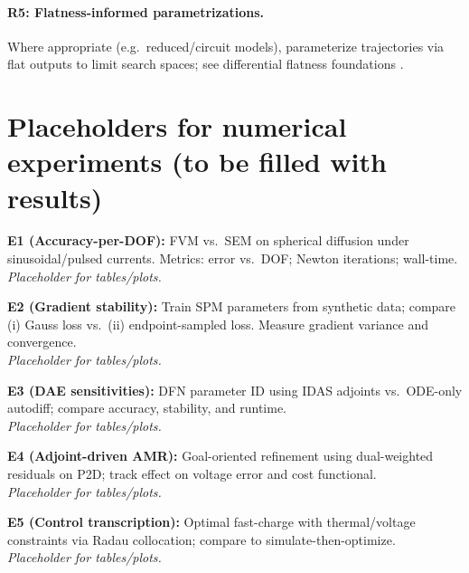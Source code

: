 \documentclass[11pt]{article}
\begin{document}
\paragraph{R5: Flatness-informed parametrizations.} Where appropriate (e.g.\ reduced/circuit models), parameterize trajectories via flat outputs to limit search spaces; see differential flatness foundations \cite{fliessflat}.

\section{Placeholders for numerical experiments (to be filled with results)}
\textbf{E1 (Accuracy-per-DOF):} FVM vs.\ SEM on spherical diffusion under sinusoidal/pulsed currents. Metrics: error vs.\ DOF; Newton iterations; wall-time.\\
\emph{Placeholder for tables/plots.}

\noindent\textbf{E2 (Gradient stability):} Train SPM parameters from synthetic data; compare (i) Gauss loss vs.\ (ii) endpoint-sampled loss. Measure gradient variance and convergence.\\
\emph{Placeholder for tables/plots.}

\noindent\textbf{E3 (DAE sensitivities):} DFN parameter ID using IDAS adjoints vs.\ ODE-only autodiff; compare accuracy, stability, and runtime.\\
\emph{Placeholder for tables/plots.}

\noindent\textbf{E4 (Adjoint-driven AMR):} Goal-oriented refinement using dual-weighted residuals on P2D; track effect on voltage error and cost functional.\\
\emph{Placeholder for tables/plots.}

\noindent\textbf{E5 (Control transcription):} Optimal fast-charge with thermal/voltage constraints via Radau collocation; compare to simulate-then-optimize.\\
\emph{Placeholder for tables/plots.}
\end{document}
